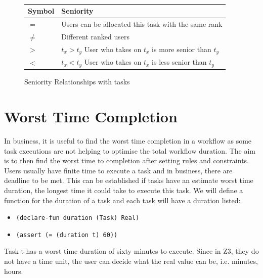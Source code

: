 \documentclass[a4paper]{report}
\begin{document}
\begin{figure}[!h]
\centering
{} \\
\begin{tabular}{ |l|l| }
\hline
Symbol & Seniority \\ \hline
$=$ & Users can be allocated this task with the same rank \\ \hline
$\neq$ & Different ranked users \\ \hline
$>$ & $t_x > t_y$ User who takes on $t_x$ is more senior than $t_y$ \\ \hline
$<$ & $t_x < t_y$ User who takes on $t_x$ is less senior than $t_y$ \\ 
\hline
\end{tabular}
\caption{Seniority Relationships with tasks}
\label{fig:Seniority Relationships with tasks}
\end{figure}

\section{Worst Time Completion}
In business, it is useful to find the worst time completion in a workflow as some task executions are not helping to optimise the total workflow duration. The aim is to then find the worst time to completion after setting rules and constraints. Users usually have finite time to execute a task and in business, there are deadline to be met. This can be established if tasks have an estimate worst time duration, the longest time it could take to execute this task. We will define a function for the duration of a task and each task will have a duration listed:
\begin{itemize}
\item \texttt{(declare-fun duration (Task) Real)}
\item \texttt{(assert (= (duration t) 60))}
\end{itemize}
Task t has a worst time duration of sixty minutes to execute. Since in Z3, they do not have a time unit, the user can decide what the real value can be, i.e. minutes, hours.
\end{document}
